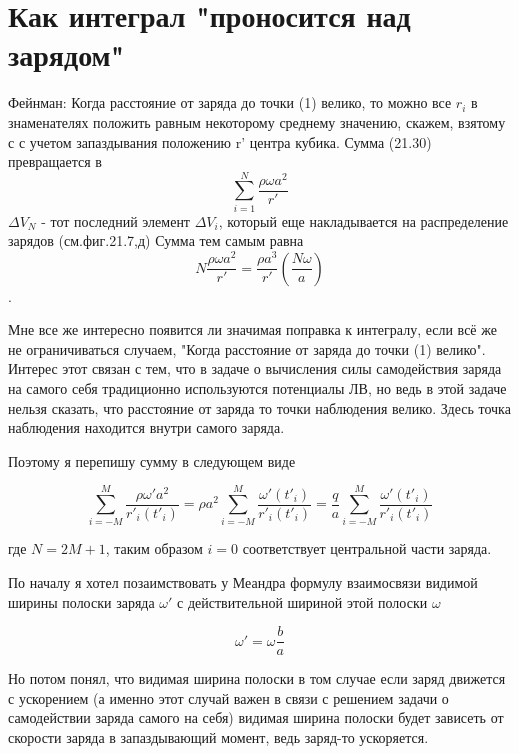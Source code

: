 \documentclass{article}
\begin{document}


\section{Как интеграл "проносится над зарядом"}

Фейнман:
Когда расстояние от заряда до точки (1) велико, то можно все $r_i$ в знаменателях положить равным некоторому среднему значению, скажем, взятому с с учетом запаздывания положению r' центра кубика. Сумма (21.30) превращается в 
$$\sum\limits_{i=1}^N \frac{\rho \omega a^2}{r'}$$
$\Delta V_N$ - тот последний элемент $\Delta V_i$, который еще накладывается на распределение зарядов (см.фиг.21.7,д)
Сумма тем самым равна
$$N\frac{\rho \omega a^2}{r'}=\frac{\rho a^3}{r'}\left (\frac{N\omega}{a}\right )$$.

Мне все же интересно появится ли значимая поправка к интегралу, если всё же не ограничиваться случаем, "Когда расстояние от заряда до точки (1) велико". Интерес этот связан с тем, что в задаче о вычисления силы самодействия заряда на самого себя традиционно используются потенциалы ЛВ, но ведь в этой задаче нельзя сказать, что расстояние от заряда то точки наблюдения велико. Здесь точка наблюдения находится внутри самого заряда.

Поэтому я перепишу сумму в следующем виде

$$\sum\limits_{i=-M}^M \frac{\rho \omega' a^2}{r'_{i}(t'_{i})}=\rho  a^2\sum\limits_{i=-M}^M \frac{\omega'(t'_{i})}{r'_{i}(t'_{i})}= \frac{q}{a}\sum\limits_{i=-M}^M \frac{\omega'(t'_{i})}{r'_{i}(t'_{i})}$$

где $N=2M+1$, таким образом $i=0$ соответствует центральной части заряда. 

По началу я хотел позаимствовать у Меандра формулу взаимосвязи видимой ширины полоски заряда $\omega'$ с действительной шириной этой полоски  $\omega$

$$\omega' = \omega \frac{b}{a}$$

Но потом понял, что видимая ширина полоски в том случае если заряд движется с ускорением (а именно этот случай важен в связи с решением задачи о самодействии заряда самого на себя) видимая ширина полоски будет зависеть от скорости заряда в запаздывающий момент, ведь заряд-то ускоряется. 
\end{document}
